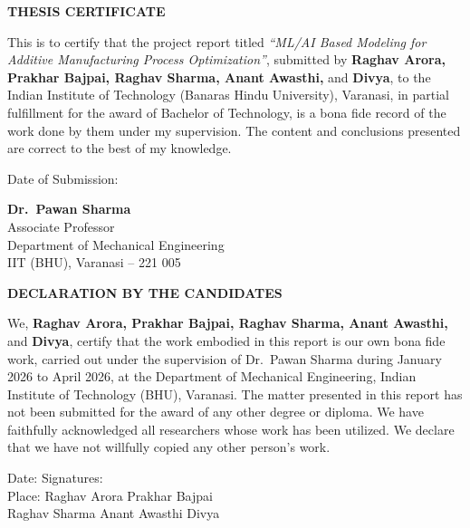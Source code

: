 \documentclass[12pt,a4paper]{report}
\begin{document}
\newpage
\thispagestyle{empty}
\begin{center}
  {\Large\bfseries THESIS CERTIFICATE}
\end{center}
\vspace{1cm}
This is to certify that the project report titled \textit{``ML/AI Based Modeling for Additive Manufacturing Process Optimization''}, submitted by \textbf{Raghav Arora, Prakhar Bajpai, Raghav Sharma, Anant Awasthi,} and \textbf{Divya}, to the Indian Institute of Technology (Banaras Hindu University), Varanasi, in partial fulfillment for the award of Bachelor of Technology, is a bona fide record of the work done by them under my supervision. The content and conclusions presented are correct to the best of my knowledge.

\vspace{2cm}
\noindent Date of Submission: \underline{\hspace{5cm}}

\vspace{1.5cm}
\noindent \textbf{Dr.\ Pawan Sharma}\\
Associate Professor\\
Department of Mechanical Engineering\\
IIT (BHU), Varanasi -- 221 005

\newpage
\thispagestyle{empty}
\begin{center}
  {\Large\bfseries DECLARATION BY THE CANDIDATES}
\end{center}
\vspace{0.8cm}
We, \textbf{Raghav Arora, Prakhar Bajpai, Raghav Sharma, Anant Awasthi,} and \textbf{Divya}, certify that the work embodied in this report is our own bona fide work, carried out under the supervision of Dr.\ Pawan Sharma during January 2026 to April 2026, at the Department of Mechanical Engineering, Indian Institute of Technology (BHU), Varanasi. The matter presented in this report has not been submitted for the award of any other degree or diploma. We have faithfully acknowledged all researchers whose work has been utilized. We declare that we have not willfully copied any other person's work.

\vspace{2cm}
\noindent Date: \underline{\hspace{4cm}} \hfill Signatures:\\[1cm]
\noindent Place: \underline{\hspace{4cm}} \hfill Raghav Arora \hfill Prakhar Bajpai\\[0.5cm]
\hfill Raghav Sharma \hfill Anant Awasthi \hfill Divya
\end{document}
